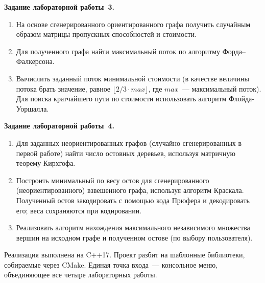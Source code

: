 \textbf{Задание лабораторной работы~3.}
\begin{enumerate}
    \item На основе сгенерированного ориентированного графа получить случайным образом
    матрицы пропускных способностей и стоимости.

    \item Для полученного графа найти максимальный поток по алгоритму
    Форда--Фалкерсона.

    \item Вычислить заданный поток минимальной стоимости (в качестве величины потока
    брать значение, равное $\lfloor 2/3 \cdot \mathit{max} \rfloor$, где
    $\mathit{max}$~--- максимальный поток). Для поиска кратчайшего пути по стоимости
    использовать алгоритм Флойда-Уоршалла.
\end{enumerate}

\textbf{Задание лабораторной работы~4.}
\begin{enumerate}
    \item Для заданных неориентированных графов (случайно сгенерированных в первой
    работе) найти число остовных деревьев, используя матричную теорему Кирхгофа.

    \item Построить минимальный по весу остов для сгенерированного (неориентированного)
    взвешенного графа, используя алгоритм Краскала. Полученный остов закодировать
    с помощью кода Прюфера и декодировать его; веса сохраняются при кодировании.

    \item Реализовать алгоритм нахождения максимального независимого множества вершин
    на исходном графе и полученном остове (по выбору пользователя).
\end{enumerate}

Реализация выполнена на C++17. Проект разбит на шаблонные библиотеки,
собираемые через CMake. Единая точка входа~--- консольное меню,
объединяющее все четыре лабораторных работы.
